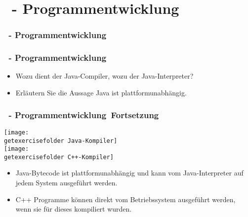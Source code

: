 \def\stitle{\theexercise\ - Programmentwicklung}
\section{\stitle}
\begin{frame}%
  \frametitle{\stitle}%
\tableofcontents[current]
\end{frame}


\begin{frame}%
  \frametitle{\stitle}%

\begin{itemize}
\item Wozu dient der Java-Compiler, wozu der Java-Interpreter?
\item Erläutern Sie die Aussage \glqq Java ist plattformunabhängig\grqq.
\end{itemize}

\end{frame}


\begin{frame}[t]%
  \frametitle{\stitle\ Fortsetzung}%
\centering

\texttt{[image: \\getexercisefolder Java-Kompiler]}\\[2em]
\texttt{[image: \\getexercisefolder C++-Kompiler]}

\begin{itemize}
 \item Java-Bytecode ist plattformunabhängig und kann vom Java-Interpreter auf jedem System ausgeführt werden.
 \item C++ Programme können direkt vom Betriebssystem ausgeführt werden, wenn sie für dieses kompiliert wurden.
\end{itemize}

\end{frame}
